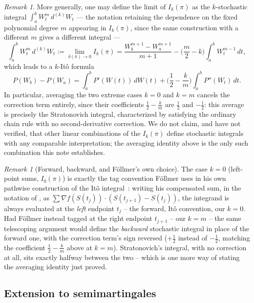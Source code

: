 \documentclass[11pt,fleqn]{article}
\theoremstyle{plain}
\theoremstyle{remark}
\newtheorem{remark}[thm]{Remark}
\begin{document}
\begin{remark}
More generally, one may define the limit of $I_k(\pi)$ as the
$k$-stochastic integral $\int_a^bW_t^m\,d^{(k)}W_t$ --- the notation
retaining the dependence on the fixed polynomial degree $m$ appearing in
$I_k(\pi)$, since the same construction with a different $m$ gives a
different integral ---
\[
\int_a^bW_t^m\,d^{(k)}W_t:=\lim_{\delta(\pi)\to0}I_k(\pi)
=\frac{W_b^{m+1}-W_a^{m+1}}{m+1}-\Big(\frac m2-k\Big)\int_a^bW_t^{m-1}\,dt,
\]
which leads to a $k$-It\^o formula
\[
P(W_b)-P(W_a)=\int_a^bP'(W(t))\,dW(t)+\Big(\frac12-\frac km\Big)\int_a^bP''(W_t)\,dt.
\]
In particular, averaging the two extreme cases $k=0$ and $k=m$ cancels
the correction term entirely, since their coefficients $\tfrac12-\tfrac
km$ are $\tfrac12$ and $-\tfrac12$: this average is precisely the
Stratonovich integral, characterized by satisfying the ordinary chain
rule with no second-derivative correction. We do not claim, and have not
verified, that other linear combinations of the $I_k(\pi)$ define
stochastic integrals with any comparable interpretation; the averaging
identity above is the only such combination this note establishes.
\end{remark}

\begin{remark}[Forward, backward, and F\"ollmer's own choice]
The case $k=0$ (left-point sums, $I_0(\pi)$) is exactly the tag
convention F\"ollmer uses in his own pathwise construction of the It\^o
integral~\cite{F}: writing his compensated sum, in the notation of
\cite{ContPerkowski19}, as $\sum\nabla f(S(t_j))\cdot(S(t_{j+1})-S(t_j))$,
the integrand is always evaluated at the \emph{left} endpoint $t_j$ --
the forward, It\^o convention, our $k=0$. Had F\"ollmer instead tagged
at the right endpoint $t_{j+1}$ -- our $k=m$ -- the same telescoping
argument would define the \emph{backward} stochastic integral in place
of the forward one, with the correction term's sign reversed
($+\frac12$ instead of $-\frac12$, matching the coefficient $\tfrac12-
\tfrac km$ above at $k=m$). Stratonovich's integral, with no correction
at all, sits exactly halfway between the two -- which is one more way
of stating the averaging identity just proved.
\end{remark}

\subsection{Extension to semimartingales}
\end{document}
